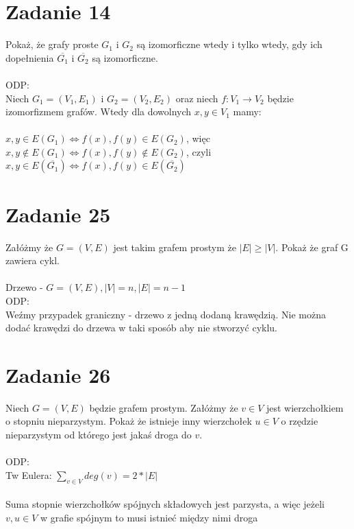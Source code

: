 \documentclass{article}
\begin{document}
\section{\centering Zadanie 14}
Pokaż, że grafy proste $G_{1}$ i $G_{2}$ są izomorficzne wtedy i tylko wtedy, gdy ich dopełnienia $\overline{G_{1}}$ i $\overline{G_{2}}$ są izomorficzne. \\\\
ODP:\\
Niech $G_{1} = (V_{1}, E_{1})$ i $G_{2} = (V_{2}, E_{2})$ oraz niech $f:V_{1} \rightarrow V_{2}$ będzie izomorfizmem grafów. Wtedy dla dowolnych $x,y \in V_{1}$ mamy:\\\\
${x,y} \in E(G_{1}) \iff {f(x),f(y)} \in E(G_{2})$, więc\\
${x,y} \notin E(G_{1}) \iff {f(x),f(y)} \notin E(G_{2})$, czyli\\
${x,y} \in E(\overline{G_{1}}) \iff {f(x),f(y)} \in E(\overline{G_{2}})$
\section{\centering Zadanie 25}
Załóżmy że $G = (V,E)$ jest takim grafem prostym że $|E| \geq |V|$. Pokaż że graf G zawiera cykl.\\\\
Drzewo - $G = (V,E), |V| = n, |E| = n-1$ \\
ODP: \\ Weźmy przypadek graniczny - drzewo z jedną dodaną krawędzią. Nie można dodać krawędzi do drzewa w taki sposób aby nie stworzyć cyklu.
\section{\centering Zadanie 26}
Niech $G = (V,E)$ będzie grafem prostym. Załóżmy że  $v \in V$ jest wierzchołkiem o stopniu nieparzystym. Pokaż że istnieje inny wierzchołek $u \in V$ o rzędzie nieparzystym od którego jest jakaś droga do $v$. \\\\
ODP: \\
Tw Eulera: $\sum_{v \in V}deg(v) = 2 * |E|$ \\\\
Suma stopnie wierzchołków spójnych składowych jest parzysta, a więc jeżeli $v,u \in V$ w grafie spójnym to musi istnieć między nimi droga
\\\\
\end{document}
